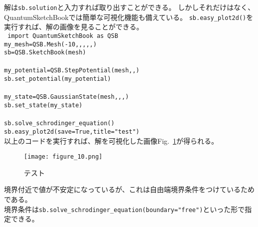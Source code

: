 \documentclass[autodetect-engine,dvipdfmx-if-dvi,ja=standard,a4paper,layout=v2]{bxjsreport}
\newcommand{\fref}[1]{Fig.~\ref{#1}}
\begin{document}
    解は\texttt{sb.solution}と入力すれば取り出すことができる。
    しかしそれだけはなく、QuantumSketchBookでは簡単な可視化機能も備えている。
    \texttt{sb.easy\_plot2d()}を実行すれば、解の画像を見ることができる。\\
    \texttt{
      import \: QuantumSketchBook \: as \: QSB\\
      my\_mesh\:=\:QSB.Mesh(-10,,,,,)\\
      sb\:=\:QSB.SketchBook(mesh)\\\\
      my\_potential\:=\:QSB.StepPotential(mesh,,)\\
      sb.set\_potential(my\_potential)\\\\
      my\_state\:=\:QSB.GaussianState(mesh,,,)\\
      sb.set\_state(my\_state)\\\\
      sb.solve\_schrodinger\_equation()\\
      sb.easy\_plot2d(save=True,\:title="test")\\
    }
    以上のコードを実行すれば、解を可視化した画像\fref{testfig}が得られる。\\
    \begin{figure}
      \centering
      \texttt{[image: figure\_10.png]}
      \caption{テスト}
      \label{testfig}
    \end{figure}
    境界付近で値が不安定になっているが、これは自由端境界条件をつけているためである。\\
    境界条件は\texttt{sb.solve\_schrodinger\_equation(boundary="free")}といった形で指定できる。
\end{document}
